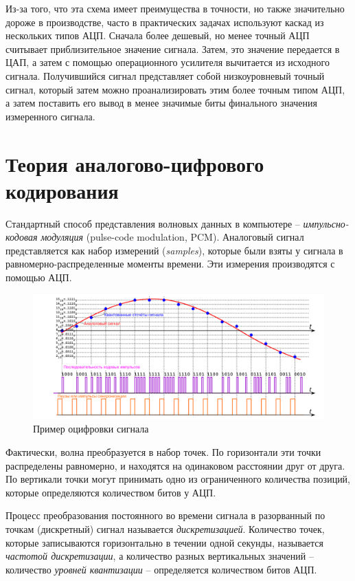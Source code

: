 \documentclass[a4page]{article}
\begin{document}
  Из-за того, что эта схема имеет преимущества в точности, но также значительно дороже в производстве,
  часто в практических задачах используют каскад из нескольких типов АЦП.
  Сначала более дешевый, но менее точный АЦП считывает приблизительное значение сигнала.
  Затем, это значение передается в ЦАП, а затем с помощью операционного усилителя вычитается из исходного сигнала.
  Получившийся сигнал представляет собой низкоуровневый точный сигнал,
  который затем можно проанализировать этим более точным типом АЦП,
  а затем поставить его вывод в менее значимые биты финального значения измеренного сигнала.


\section{Теория аналогово-цифрового кодирования}

Стандартный способ представления волновых данных в компьютере -- \emph{импульсно-кодовая модуляция} (pulse-code modulation, PCM).
Аналоговый сигнал представляется как набор измерений (\emph{samples}), которые были взяты у сигнала в равномерно-распределенные моменты времени.
Эти измерения производятся с помощью АЦП.

\begin{figure}
  \includegraphics[width=\linewidth]{Pcm-ru.svg.png}
  \caption{Пример оцифровки сигнала~\cite{wiki:pcm}}
  \label{fig:pcm-wave}
\end{figure}

Фактически, волна преобразуется в набор точек.
По горизонтали эти точки распределены равномерно, и находятся на одинаковом расстоянии друг от друга.
По вертикали точки могут принимать одно из ограниченного количества позиций, которые определяются количеством битов у АЦП.

Процесс преобразования постоянного во времени сигнала в разорванный по точкам (дискретный) сигнал называется \emph{дискретизацией}.
Количество точек, которые записываются горизонтально в течении одной секунды, называется \emph{частотой дискретизации},
а количество разных вертикальных значений -- количество \emph{уровней квантизации} -- определяется количеством битов АЦП.
\end{document}
